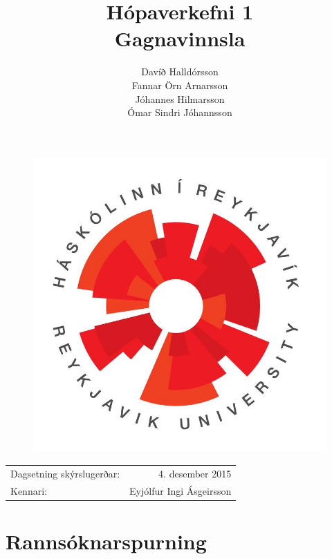 \documentclass[12pt,a4paper]{article}
\begin{document}


\title{Hópaverkefni 1 \\ Gagnavinnsla}
\begin{figure}
\centering
\includegraphics[scale=0.35]{ru}
\end{figure}
\author{Davíð Halldórsson \\ Fannar Örn Arnarsson \\ Jóhannes Hilmarsson \\ Ómar Sindri Jóhannsson}
\date{}
\maketitle

\begin{center}
\begin{tabular}{l r}
Dagsetning skýrslugerðar: &  4. desember 2015\\
Kennari: & Eyjólfur Ingi Ásgeirsson  \\ 
\end{tabular}
\end{center}

\newpage
{} 

\setlength\parindent{0pt} %


\section{Rannsóknarspurning}
\end{document}
